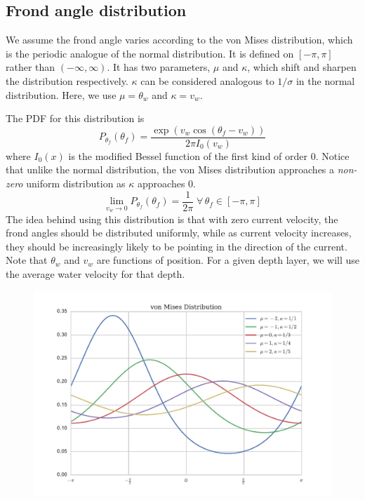 \subsection{Frond angle distribution}
\label{sec:angle_dist}
We assume the frond angle varies according to the von Mises distribution, which is the periodic analogue of the normal distribution.
It is defined on $[-\pi,\pi]$ rather than $(-\infty,\infty)$.
It has two parameters, $\mu$ and $\kappa$, which shift and sharpen the
distribution respectively.
$\kappa$ can be considered analogous to $1/\sigma$ in the normal distribution.
Here, we use $\mu = \theta_w$ and $\kappa = v_w$.

The PDF for this distribution is
\begin{equation}
	P_{\theta_f}(\theta_f) = \frac{\exp\left(v_w\cos(\theta_f-v_w)\right)}{2\pi I_0(v_w)}
\end{equation}
where $I_0(x)$ is the modified Bessel function of the first kind of order 0.
Notice that unlike the normal distribution, the von Mises distribution approaches a \textit{non-zero} uniform distribution as $\kappa$ approaches 0.
\begin{equation}
	\displaystyle \lim_{v_w \to 0}P_{\theta_f}(\theta_f) = \frac{1}{2\pi} \;\forall\, \theta_f \in [-\pi,\pi]
\end{equation}
The idea behind using this distribution is that with zero current velocity, the frond angles should be distributed uniformly, while as current velocity increases, they should be increasingly likely to be pointing in the direction of the current.
Note that $\theta_w$ and $v_w$ are functions of position.
For a given depth layer, we will use the average water velocity for that depth.

\begin{figure}[h]
	\centering
	\includegraphics[width=.75\linewidth]{vonmises_2}
	\label{fig:vonmises}
\end{figure}

